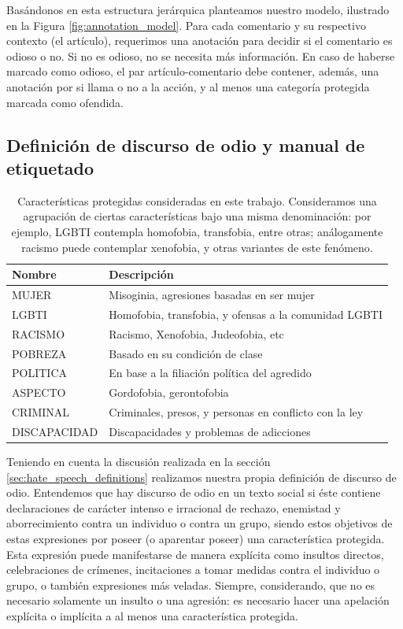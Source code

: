 Basándonos en esta estructura jerárquica planteamos nuestro modelo, ilustrado en la Figura \ref{fig:annotation_model}. Para cada comentario y su respectivo contexto (el artículo), requerimos una anotación para decidir si el comentario es odioso o no. Si no es odioso, no se necesita más información. En caso de haberse marcado como odioso, el par artículo-comentario debe contener, además, una anotación por si llama o no a la acción, y al menos una categoría protegida marcada como ofendida.


\subsection{Definición de discurso de odio y manual de etiquetado}
\label{sec:05_hate_speech_definition}
\begin{table}[t]
    \centering
    \small
    \begin{tabularx}{\textwidth}{l X}
        Nombre & Descripción \\
        \hline
        MUJER        & Misoginia, agresiones basadas en ser mujer  \\
        LGBTI        & Homofobia, transfobia, y ofensas a la comunidad LGBTI \\
        RACISMO      & Racismo, Xenofobia, Judeofobia, etc \\
        POBREZA      & Basado en su condición de clase \\
        POLITICA     & En base a la filiación política del agredido \\
        ASPECTO      & Gordofobia, gerontofobia \\
        CRIMINAL     & Criminales, presos, y personas en conflicto con la ley \\
        DISCAPACIDAD & Discapacidades y problemas de adicciones \\
        \hline
    \end{tabularx}
    \caption{Características protegidas consideradas en este trabajo. Consideramos una agrupación de ciertas características bajo una misma denominación: por ejemplo, LGBTI contempla homofobia, transfobia, entre otras; análogamente racismo puede contemplar xenofobia, y otras variantes de este fenómeno. }
    \label{tab:caracteristicas_protegidas}
\end{table}


Teniendo en cuenta la discusión realizada en la sección \ref{sec:hate_speech_definitions} realizamos nuestra propia definición de discurso de odio. Entendemos que hay discurso de odio en un texto social si éste contiene declaraciones de carácter intenso e irracional de rechazo, enemistad y aborrecimiento contra un individuo o contra un grupo, siendo estos objetivos de estas expresiones por poseer (o aparentar poseer) una característica protegida. Esta expresión puede manifestarse de manera explícita como insultos directos, celebraciones de crímenes, incitaciones a tomar medidas contra el individuo o grupo, o también expresiones más veladas. Siempre, considerando, que no es necesario solamente un insulto o una agresión: es necesario hacer una apelación explícita o implícita a al menos una característica protegida.

